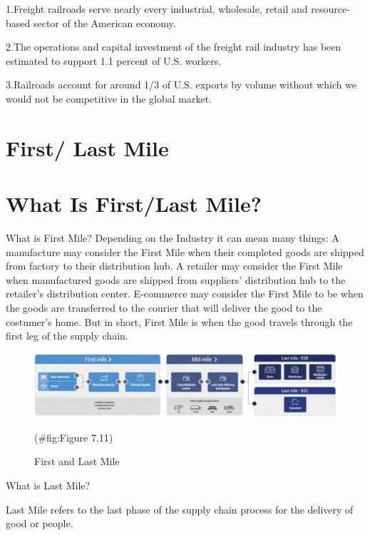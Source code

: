\documentclass[
]{book}
\begin{document}
1.Freight railroads serve nearly every industrial, wholesale, retail and resource-based sector of the American economy.

2.The operations and capital investment of the freight rail industry has been estimated to support 1.1 percent of U.S. workers.

3.Railroads account for around 1/3 of U.S. exports by volume without which we would not be competitive in the global market.

\hypertarget{SupplyChain-FirstandLastMile}{%
\section{First/ Last Mile}\label{SupplyChain-FirstandLastMile}}

\hypertarget{SupplyChain-whatismile}{%
\section{What Is First/Last Mile?}\label{SupplyChain-whatismile}}

What is First Mile?
Depending on the Industry it can mean many things:
A manufacture may consider the First Mile when their completed goods are shipped from factory to their distribution hub.
A retailer may consider the First Mile when manufactured goods are shipped from suppliers' distribution hub to the retailer's distribution center.
E-commerce may consider the First Mile to be when the goods are transferred to the courier that will deliver the good to the costumer's home.
But in short, First Mile is when the good travels through the first leg of the supply chain.

\begin{figure}

{\centering \includegraphics{./Images/supplychain/First and Last Mile} 

}

\caption{First and Last Mile}(\#fig:Figure 7.11)
\end{figure}

What is Last Mile?

Last Mile refers to the last phase of the supply chain process for the delivery of good or people.
\end{document}
